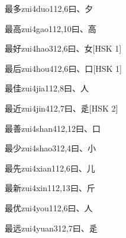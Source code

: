 \begin{entry}{最多}{zui4duo1}{12,6}{⽈、⼣}
\end{entry}

\begin{entry}{最高}{zui4gao1}{12,10}{⽈、⾼}
\end{entry}

\begin{entry}{最好}{zui4hao3}{12,6}{⽈、⼥}[HSK 1]
\end{entry}

\begin{entry}{最后}{zui4hou4}{12,6}{⽈、⼝}[HSK 1]
\end{entry}

\begin{entry}{最佳}{zui4jia1}{12,8}{⽈、⼈}
\end{entry}

\begin{entry}{最近}{zui4jin4}{12,7}{⽈、⾡}[HSK 2]
\end{entry}

\begin{entry}{最善}{zui4shan4}{12,12}{⽈、⼝}
\end{entry}

\begin{entry}{最少}{zui4shao3}{12,4}{⽈、⼩}
\end{entry}

\begin{entry}{最先}{zui4xian1}{12,6}{⽈、⼉}
\end{entry}

\begin{entry}{最新}{zui4xin1}{12,13}{⽈、⽄}
\end{entry}

\begin{entry}{最优}{zui4you1}{12,6}{⽈、⼈}
\end{entry}

\begin{entry}{最远}{zui4yuan3}{12,7}{⽈、⾡}
\end{entry}

